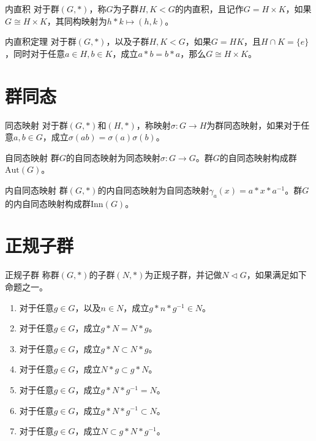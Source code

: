 \documentclass[lang = cn, scheme = chinese, thmcnt = section]{elegantbook}
\begin{document}
\begin{definition}{内直积}
	对于群$(G,*)$，称$G$为子群$H,K<G$的内直积，且记作$G=H\times K$，如果$G\cong H\times K$，其同构映射为$h*k\mapsto(h,k)$。
\end{definition}

\begin{theorem}{内直积定理}
	对于群$(G,*)$，以及子群$H,K<G$，如果$G=HK$，且$H\cap K=\{e\}$，同时对于任意$a\in H,b\in K$，成立$a*b=b*a$，那么$G\cong H\times K$。
\end{theorem}

\section{群同态}

\begin{definition}{同态映射}
	对于群$(G,*)$和$(H,*)$，称映射$\sigma:G\to H$为群同态映射，如果对于任意$a,b\in G$，成立$\sigma(ab)=\sigma(a)\sigma(b)$。
\end{definition}

\begin{definition}{自同态映射}
	群$G$的自同态映射为同态映射$\sigma:G\to G$。群$G$的自同态映射构成群$\mathrm{Aut}(G)$。
\end{definition}

\begin{definition}{内自同态映射}
	群$(G,*)$的内自同态映射为自同态映射$\gamma_a(x)= a*x*a^{-1}$。群$G$的内自同态映射构成群$\mathrm{Inn}(G)$。
\end{definition}

\section{正规子群}

\begin{definition}{正规子群}
	称群$(G,*)$的子群$(N,*)$为正规子群，并记做$N \triangleleft  G$，如果满足如下命题之一。
	\begin{enumerate}
		\item 对于任意$g\in G$，以及$n\in N$，成立$g*n*g^{-1}\in N$。
		\item 对于任意$g\in G$，成立$g*N=N*g$。
		\item 对于任意$g\in G$，成立$g*N\subset N*g$。
		\item 对于任意$g\in G$，成立$N*g\subset g*N$。
		\item 对于任意$g\in G$，成立$g*N*g^{-1}=N$。
		\item 对于任意$g\in G$，成立$g*N*g^{-1}\subset N$。
		\item 对于任意$g\in G$，成立$N\subset g*N*g^{-1}$。
	\end{enumerate}
\end{definition}
\end{document}
